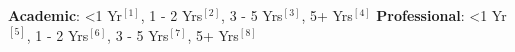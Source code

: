 \begin{cventries}
  \cventry
    {} %
    {} 
    {} 
    {} 
    {
      \begin{cvitems} %
        \item[]{\textbf{Academic}: \label{1}{<1 Yr$^{[1]}$}, \label{2}{1 - 2 Yrs$^{[2]}$}, \label{3}{3 - 5 Yrs$^{[3]}$}, \label{4}{5+ Yrs$^{[4]}$}%
		\hspace{2.2cm}
		\textbf{Professional}: \label{5}{<1 Yr$^{[5]}$}, \label{6}{1 - 2 Yrs$^{[6]}$}, \label{7}{3 - 5 Yrs$^{[7]}$}, \label{8}{5+ Yrs$^{[8]}$}}		
      \end{cvitems}
    }  
  \vspace{0.2cm} 
      

\end{cventries}
